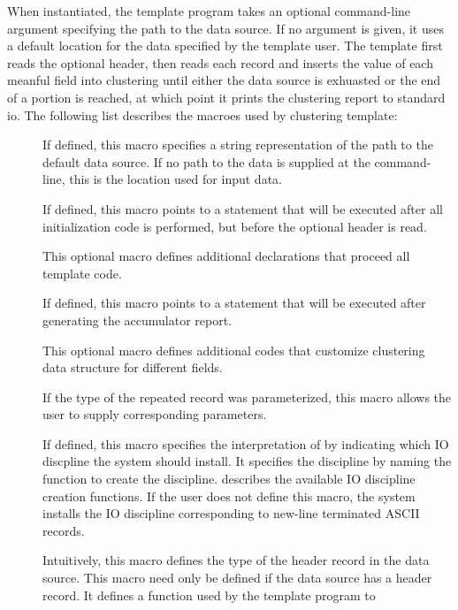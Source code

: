 When instantiated, the template program takes an optional command-line
argument specifying the path to the data source. If no argument is
given, it uses a default location for the data specified by the
template user. The template first reads the optional header, then
reads each record and inserts the value of each meanful field into
clustering until either the data source is exhuasted or the end of a
portion is reached, at which point it prints the clustering report to
standard io. The following list describes the macroes used by
clustering template:

\begin{description}

\item[] If defined, this macro specifies a string
  representation of the path to the default data source. If no path to
  the data is supplied at the command-line, this is the location used
  for input data. 
\item[] If defined, this macro points to a \C{}
  statement that will be executed after all initialization code is
  performed, but before the optional header is read.
\item[] This optional macro defines additional \C{}
  declarations that proceed all template code.
\item[] If defined, this macro points to a \C{}
  statement that will be executed after generating the accumulator report.
\item[] This optional macro defines additional \C{}
  codes that customize clustering data structure for different fields.
\item[] If the type of the repeated record was
  parameterized, this macro allows the user to supply corresponding
  parameters. 
\item[] If defined, this macro specifies the
  interpretation of \Precord{} by indicating which IO discpline the
  system should install. It specifies the discipline by naming the
  function to create the discipline. 
  describes the available IO discipline creation functions.  If the
  user does not define this macro, the system installs the IO
  discipline corresponding to  new-line terminated ASCII records.
\item[] Intuitively, this macro defines the type of
  the header record in the data source. This macro need only be
  defined if the data source has a header record. It defines a function used by the template program to

\end{description}
